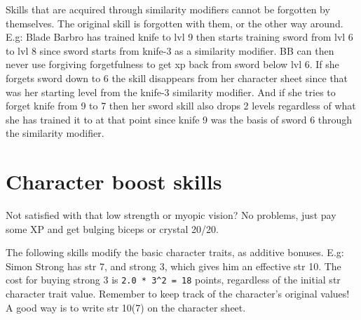 Skills that are acquired through similarity modifiers cannot be forgotten by themselves. The original skill is forgotten with them, or the other way around.
E.g: Blade Barbro has trained knife to lvl 9 then starts training sword from lvl 6 to lvl 8 since sword starts from knife-3 as a similarity modifier. BB can then never use forgiving forgetfulness to get xp back from sword below lvl 6. If she forgets sword down to 6 the skill disappears from her character sheet since that was her starting level from the knife-3 similarity modifier.
And if she tries to forget knife from 9 to 7 then her sword skill also drops 2 levels regardless of what she has trained it to at that point since knife 9 was the basis of sword 6 through the similarity modifier.



\closeskillslist

















\section*{Character boost skills}

Not satisfied with that low strength or myopic vision? No problems, just pay some XP and get bulging biceps or crystal 20/20.

The following skills modify the basic character traits, as additive bonuses.
E.g: Simon Strong has str 7, and strong 3, which gives him an effective str 10.
The cost for buying strong 3 is \verb|2.0 * 3^2 = 18| points, regardless of the initial str character trait value. Remember to keep track of the character's original values! A good way is to write str 10(7) on the character sheet.


\openskillslist

